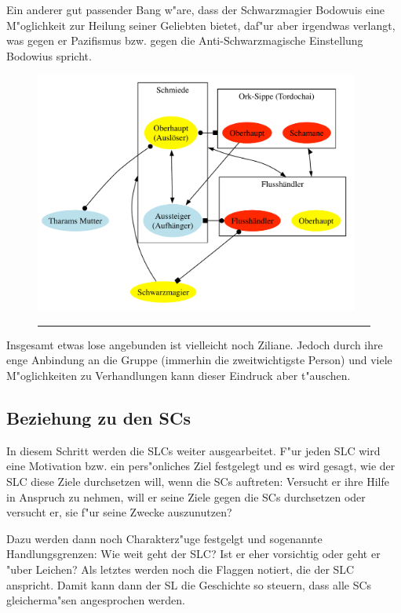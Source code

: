 Ein anderer gut passender Bang w"are, dass der Schwarzmagier Bodowuis eine M"oglichkeit zur Heilung seiner Geliebten bietet, daf"ur aber irgendwas verlangt, was gegen er Pazifismus bzw. gegen die Anti-Schwarzmagische Einstellung Bodowius spricht.

\begin{figure}[t]
\centerline{\includegraphics[width=0.95\textwidth]{pics/web2}}
\label{ABBKonfliktNetzBeispiel}
\hrule
\end{figure}

Insgesamt etwas lose angebunden ist vielleicht noch Ziliane. Jedoch durch ihre enge Anbindung an die Gruppe (immerhin die zweitwichtigste Person) und viele M"oglichkeiten zu Verhandlungen kann dieser Eindruck aber t"auschen.



\subsection{Beziehung zu den SCs}
In diesem Schritt werden die SLCs weiter ausgearbeitet. F"ur jeden SLC wird eine Motivation bzw. ein pers"onliches Ziel festgelegt und es wird gesagt, wie der SLC diese Ziele durchsetzen will, wenn die SCs auftreten: Versucht er ihre Hilfe in Anspruch zu nehmen, will er seine Ziele gegen die SCs durchsetzen oder versucht er, sie f"ur seine Zwecke auszunutzen?

Dazu werden dann noch Charakterz"uge festgelgt und sogenannte Handlungsgrenzen: Wie weit geht der SLC? Ist er eher vorsichtig oder geht er "uber Leichen? Als letztes werden noch die Flaggen notiert, die der SLC anspricht. Damit kann dann der SL die Geschichte so steuern, dass alle SCs gleicherma"sen angesprochen werden.

